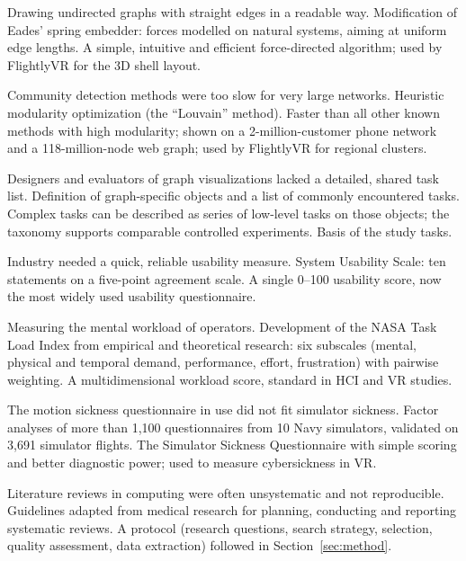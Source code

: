 \documentclass[11pt,a4paper]{article}
\newcommand{\system}{FlightlyVR}
\begin{document}
\prob Drawing undirected graphs with straight edges in a readable way.
\meth Modification of Eades' spring embedder: forces modelled on natural systems, aiming at
uniform edge lengths.
\res A simple, intuitive and efficient force-directed algorithm; used by \system{} for the
3D shell layout.

\prob Community detection methods were too slow for very large networks.
\meth Heuristic modularity optimization (the ``Louvain'' method).
\res Faster than all other known methods with high modularity; shown on a 2-million-customer
phone network and a 118-million-node web graph; used by \system{} for regional clusters.

\prob Designers and evaluators of graph visualizations lacked a detailed, shared task list.
\meth Definition of graph-specific objects and a list of commonly encountered tasks.
\res Complex tasks can be described as series of low-level tasks on those objects; the
taxonomy supports comparable controlled experiments. Basis of the study tasks.

\prob Industry needed a quick, reliable usability measure.
\meth System Usability Scale: ten statements on a five-point agreement scale.
\res A single 0--100 usability score, now the most widely used usability questionnaire.

\prob Measuring the mental workload of operators.
\meth Development of the NASA Task Load Index from empirical and theoretical research: six
subscales (mental, physical and temporal demand, performance, effort, frustration) with
pairwise weighting.
\res A multidimensional workload score, standard in HCI and VR studies.

\prob The motion sickness questionnaire in use did not fit simulator sickness.
\meth Factor analyses of more than 1,100 questionnaires from 10 Navy simulators, validated
on 3,691 simulator flights.
\res The Simulator Sickness Questionnaire with simple scoring and better diagnostic power;
used to measure cybersickness in VR.

\prob Literature reviews in computing were often unsystematic and not reproducible.
\meth Guidelines adapted from medical research for planning, conducting and reporting
systematic reviews.
\res A protocol (research questions, search strategy, selection, quality assessment, data
extraction) followed in Section~\ref{sec:method}.
\end{document}
